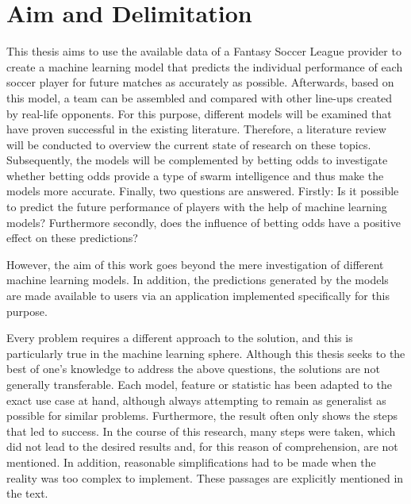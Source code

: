 \clearpage \section{Aim and Delimitation}

This thesis aims to use the available data of a Fantasy Soccer League provider to create a machine learning model that predicts the individual performance of each soccer player for future matches as accurately as possible. Afterwards, based on this model, a team can be assembled and compared with other line-ups created by real-life opponents. For this purpose, different models will be examined that have proven successful in the existing literature. Therefore, a literature review will be conducted to overview the current state of research on these topics. Subsequently, the models will be complemented by betting odds to investigate whether betting odds provide a type of swarm intelligence and thus make the models more accurate. Finally, two questions are answered. Firstly: Is it possible to predict the future performance of players with the help of machine learning models? Furthermore secondly, does the influence of betting odds have a positive effect on these predictions?

However, the aim of this work goes beyond the mere investigation of different machine learning models. In addition, the predictions generated by the models are made available to users via an application implemented specifically for this purpose.  

Every problem requires a different approach to the solution, and this is particularly true in the machine learning sphere. Although this thesis seeks to the best of one's knowledge to address the above questions, the solutions are not generally transferable. Each model, feature or statistic has been adapted to the exact use case at hand, although always attempting to remain as generalist as possible for similar problems. Furthermore, the result often only shows the steps that led to success. In the course of this research, many steps were taken, which did not lead to the desired results and, for this reason of comprehension, are not mentioned. In addition, reasonable simplifications had to be made when the reality was too complex to implement. These passages are explicitly mentioned in the text.  

